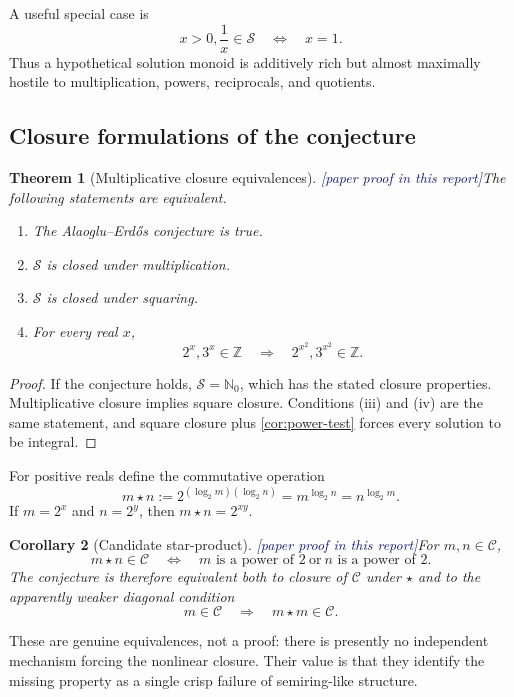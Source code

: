 \documentclass[11pt,oneside]{article}
\newtheorem{theorem}{Theorem}[section]
\newtheorem{corollary}[theorem]{Corollary}
\theoremstyle{definition}
\newcommand{\Nzero}{\mathbb N_0}
\newcommand{\Z}{\mathbb Z}
\newcommand{\Sol}{\mathcal S}
\newcommand{\Cand}{\mathcal C}
\newcommand{\tagPaper}{\textcolor{MidnightBlue}{\textsf{[paper proof in this report]}}}
\begin{document}
A useful special case is
\[
  x>0,
\frac1x\in\Sol
  \quad\Longleftrightarrow\quad x=1.
\]
Thus a hypothetical solution monoid is additively rich but almost maximally hostile to
multiplication, powers, reciprocals, and quotients.

\subsection{Closure formulations of the conjecture}

\begin{theorem}[Multiplicative closure equivalences]\label{thm:closure-equivalences}
\tagPaper The following statements are equivalent.
\begin{enumerate}[label=\textup{(\roman*)}]
\item The Alaoglu--Erd\H{o}s conjecture is true.
\item \(\Sol\) is closed under multiplication.
\item \(\Sol\) is closed under squaring.
\item For every real \(x\),
\[
  2^x,3^x\in\Z
  \quad\Longrightarrow\quad
  2^{x^2},3^{x^2}\in\Z.
\]
\end{enumerate}
\end{theorem}

\begin{proof}
If the conjecture holds, \(\Sol=\Nzero\), which has the stated closure properties.
Multiplicative closure implies square closure.  Conditions (iii) and (iv) are the same
statement, and square closure plus \cref{cor:power-test} forces every solution to be
integral.
\end{proof}

For positive reals define the commutative operation
\[
  m\star n
  :=2^{(\log_2m)(\log_2n)}
  =m^{\log_2n}=n^{\log_2m}.
\]
If \(m=2^x\) and \(n=2^y\), then \(m\star n=2^{xy}\).

\begin{corollary}[Candidate star-product]\label{cor:star-product}
\tagPaper For \(m,n\in\Cand\),
\[
  m\star n\in\Cand
  \quad\Longleftrightarrow\quad
  m\text{ is a power of }2\ \text{or}\ n\text{ is a power of }2.
\]
The conjecture is therefore equivalent both to closure of \(\Cand\) under \(\star\) and
to the apparently weaker diagonal condition
\[
  m\in\Cand\quad\Longrightarrow\quad m\star m\in\Cand.
\]
\end{corollary}

These are genuine equivalences, not a proof: there is presently no independent mechanism
forcing the nonlinear closure.  Their value is that they identify the missing property as
a single crisp failure of semiring-like structure.
\end{document}
